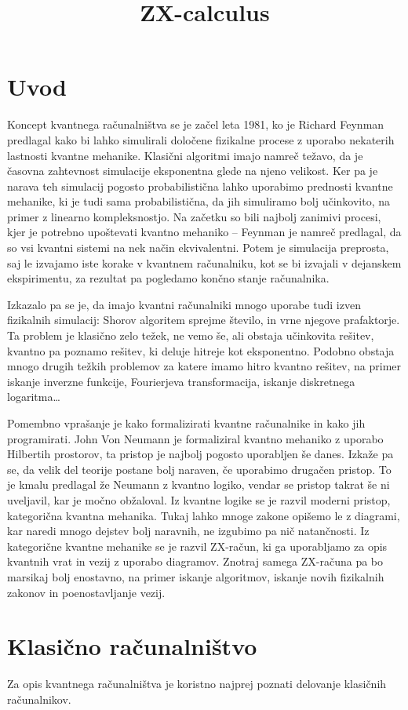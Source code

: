 \documentclass[mat1]{fmfdelo}
\title{ZX-calculus}
\begin{document}
\section{Uvod}
Koncept kvantnega računalništva se je začel leta 1981, ko je Richard Feynman predlagal kako bi lahko simulirali določene fizikalne procese z uporabo nekaterih lastnosti kvantne mehanike\cite{feynmann}. Klasični algoritmi imajo namreč težavo, da je časovna zahtevnost simulacije eksponentna glede na njeno velikost. Ker pa je narava teh simulacij pogosto probabilistična lahko uporabimo prednosti kvantne mehanike, ki je tudi sama probabilistična, da jih simuliramo bolj učinkovito, na primer z linearno kompleksnostjo. Na začetku so bili najbolj zanimivi procesi, kjer je potrebno upoštevati kvantno mehaniko -- Feynman je namreč predlagal, da so vsi kvantni sistemi na nek način ekvivalentni. Potem je simulacija preprosta, saj le izvajamo iste korake v kvantnem računalniku, kot se bi izvajali v dejanskem ekspirimentu, za rezultat pa pogledamo končno stanje računalnika.

Izkazalo pa se je, da imajo kvantni računalniki mnogo uporabe tudi izven fizikalnih simulacij: Shorov algoritem sprejme število, in vrne njegove prafaktorje. Ta problem je klasično zelo težek, ne vemo še, ali obstaja učinkovita rešitev, kvantno pa poznamo rešitev, ki deluje hitreje kot eksponentno. Podobno obstaja mnogo drugih težkih problemov za katere imamo hitro kvantno rešitev, na primer iskanje inverzne funkcije, Fourierjeva transformacija, iskanje diskretnega logaritma\ldots

Pomembno vprašanje je kako formalizirati kvantne računalnike in kako jih programirati. John Von Neumann je formaliziral kvantno mehaniko z uporabo Hilbertih prostorov, ta pristop je najbolj pogosto uporabljen še danes\cite{neumann}. Izkaže pa se, da velik del teorije postane bolj naraven, če uporabimo drugačen pristop. To je kmalu predlagal že Neumann z kvantno logiko, vendar se pristop takrat še ni uveljavil, kar je močno obžaloval. Iz kvantne logike se je razvil moderni pristop, kategorična kvantna mehanika. Tukaj lahko mnoge zakone opišemo le z diagrami, kar naredi mnogo dejstev bolj naravnih, ne izgubimo pa nič natančnosti. Iz kategorične kvantne mehanike se je razvil ZX-račun, ki ga uporabljamo za opis kvantnih vrat in vezij z uporabo diagramov. Znotraj samega ZX-računa pa bo marsikaj bolj enostavno, na primer iskanje algoritmov, iskanje novih fizikalnih zakonov in poenostavljanje vezij.

\section{Klasično računalništvo}
Za opis kvantnega računalništva je koristno najprej poznati delovanje klasičnih računalnikov. 
\end{document}

